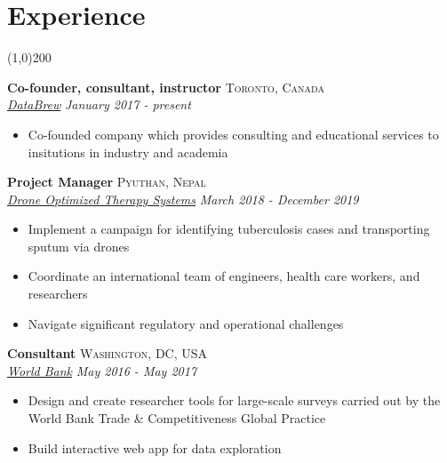 \documentclass[11pt]{article}
\begin{document}
\newpage

\section*{Experience} %
\vspace{-7mm}
\line(1,0){200}
\vspace{2mm}

\noindent \textbf{Co-founder, consultant, instructor} \hfill \textsc{Toronto, Canada}\\
\noindent \emph{\href{www.databrew.cc}{DataBrew}} \hfill \emph{January 2017 - present}
\vspace{-2mm}
\begin{itemize}\itemsep0pt \parskip0pt 
\item Co-founded company which provides consulting and educational services to insitutions in industry and academia
\end{itemize}

\noindent \textbf{Project Manager} \hfill \textsc{Pyuthan, Nepal}\\
\noindent \emph{\href{http://droneots.com/}{Drone Optimized Therapy Systems}} \hfill \emph{March 2018 - December 2019}
\vspace{-2mm}
\begin{itemize}\itemsep0pt \parskip0pt 
\item Implement a campaign for identifying tuberculosis cases and transporting sputum via drones
\item Coordinate an international team of engineers, health care workers, and researchers
\item Navigate significant regulatory and operational challenges 
\end{itemize}


\noindent \textbf{Consultant} \hfill \textsc{Washington, DC, USA}\\
\noindent \emph{\href{http://www.worldbank.org/}{World Bank}} \hfill \emph{May 2016 - May 2017}
\vspace{-2mm}
\begin{itemize}\itemsep0pt \parskip0pt 
\item Design and create researcher tools for large-scale surveys carried out by the World Bank Trade & Competitiveness Global Practice
\item Build interactive web app for data exploration
\end{itemize}
\end{document}
